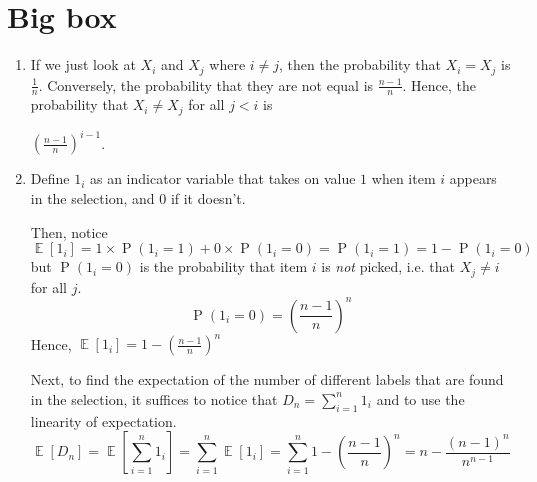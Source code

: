 \documentclass[11pt,letterpaper]{article}
\newcommand{\question}{\section}
\newcommand{\parens}[1]{\left(#1\right)}
\DeclareMathOperator{\Prob}{P}
\renewcommand{\P}[1]{\Prob{\parens{#1}}}
\DeclareMathOperator{\Expect}{\mathbb{E}}
\newcommand{\E}[1]{\Expect{\left[#1\right]}}
\begin{document}
\question{Big box}

\begin{enumerate}
    \item
        If we just look at $X_i$ and $X_j$ where $i \neq j$, then the
        probability that $X_i = X_j$ is $\frac{1}{n}$.
        Conversely, the probability that they are not equal is $\frac{n-1}{n}$.
        Hence, the probability that $X_i \neq X_j$ for all $j < i$ is

        $\parens{\frac{n-1}{n}}^{i-1}$.

    \item
        Define $1_i$ as an indicator variable that takes on value $1$ when item
        $i$ appears in the selection, and $0$ if it doesn't.

        Then, notice
        \begin{equation*}
            \E{1_i}
            = 1 \times \P{1_i = 1} + 0 \times \P{1_i = 0}
            = \P{1_i = 1}
            = 1 - \P{1_i = 0}
        \end{equation*}
        but $\P{1_i = 0}$ is the probability that item $i$ is \emph{not}
        picked, i.e. that $X_j \neq i$ for all $j$.
        \begin{equation*}
            \P{1_i = 0} = \parens{
                \frac{n - 1}{n}
            }^n
        \end{equation*}
        Hence, $\E{1_i} = 1 - \parens{\frac{n-1}{n}}^n$

        Next, to find the expectation of the number of different labels that
        are found in the selection, it suffices to notice that
        $D_n = \sum_{i=1}^n 1_i$ and to use the linearity of expectation.
        \begin{equation*}
            \E{D_n}
            = \E{\sum_{i=1}^n 1_i}
            = \sum_{i=1}^n \E{1_i}
            = \sum_{i=1}^n {1 - \parens{\frac{n-1}{n}}^n}
            = n - \frac{(n-1)^n}{n^{n-1}}
        \end{equation*}


\end{enumerate}
\end{document}

